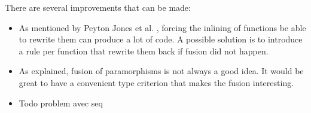 
There are several improvements that can be made:
\begin{itemize}
\item As mentioned by Peyton Jones et al. \cite{pbr}, forcing the inlining of functions be able to rewrite them can produce a lot of code. A possible solution is to introduce a rule per function that rewrite them back if fusion did not happen.
\item As explained, fusion of paramorphisms is not always a good idea. It would be great to have a convenient type criterion that makes the fusion interesting.
\item Todo problem avec seq
\end{itemize}